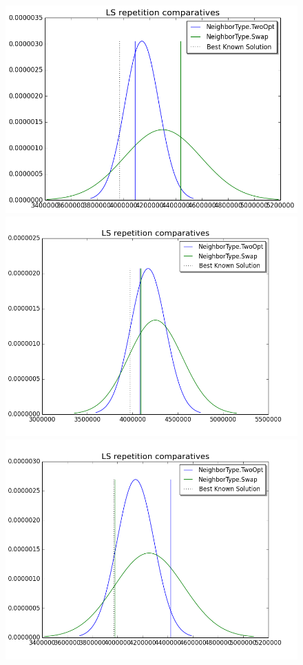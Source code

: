 \documentclass[10pt,a4paper]{article}
\begin{document}
\begin{figure}[!htb]
  \includegraphics[width=\linewidth]{optSwapComparative.png}
\endminipage\hfill
{}
  \includegraphics[width=\linewidth]{optSwapComparative_2.png}
\endminipage\hfill
{}
  \includegraphics[width=\linewidth]{optSwapComparative_3.png}

\end{figure}
\end{document}
